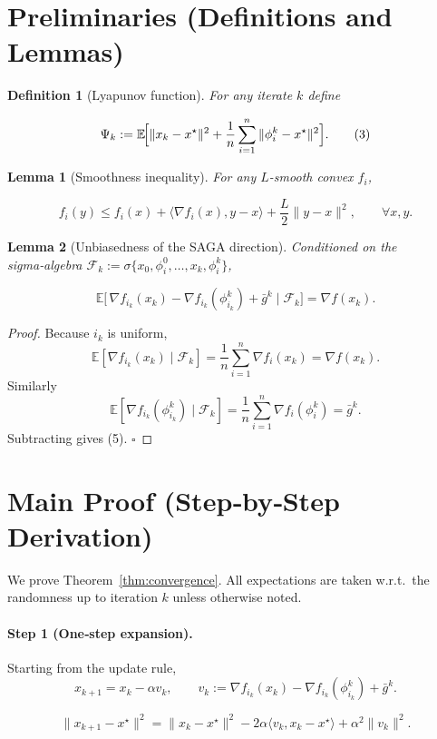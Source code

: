 \documentclass{article}
\newtheorem{lemma}{Lemma}
\newtheorem{definition}{Definition}
\newcommand{\E}{\mathbb{E}}
\begin{document}
\section*{Preliminaries (Definitions and Lemmas)}
\begin{definition}[Lyapunov function]
For any iterate \(k\) define  

\[
\Psi_k:=\E\!\Bigl[\|x_k-x^{\star}\|^{2}
      +\frac{1}{n}\sum_{i=1}^{n}\|\phi_i^{k}-x^{\star}\|^{2}\Bigr].
\tag{3}
\]
\end{definition}

\begin{lemma}[Smoothness inequality]\label{lem:smooth}
For any \(L\)-smooth convex \(f_i\),

\[
f_i(y)\le f_i(x)+\langle\nabla f_i(x),y-x\rangle+\frac{L}{2}\|y-x\|^{2},
\qquad\forall x,y.
\tag{4}
\]
\end{lemma}

\begin{lemma}[Unbiasedness of the SAGA direction]\label{lem:unbiased}
Conditioned on the sigma‑algebra \(\mathcal{F}_k:=\sigma\{x_0,\phi_i^{0},\dots ,x_k,\phi_i^{k}\}\),

\[
\E\!\bigl[\,\nabla f_{i_k}(x_k)-\nabla f_{i_k}(\phi_{i_k}^{k})+\bar g^{k}\mid\mathcal{F}_k\bigr]=\nabla f(x_k).
\tag{5}
\]
\end{lemma}
\begin{proof}
Because \(i_k\) is uniform,
\[
\E[\nabla f_{i_k}(x_k)\mid\mathcal{F}_k]=\frac{1}{n}\sum_{i=1}^{n}\nabla f_i(x_k)=\nabla f(x_k).
\]
Similarly
\[
\E[\nabla f_{i_k}(\phi_{i_k}^{k})\mid\mathcal{F}_k]=\frac{1}{n}\sum_{i=1}^{n}\nabla f_i(\phi_i^{k})=\bar g^{k}.
\]
Subtracting gives (5). \(\square\)
\end{proof}

\section*{Main Proof (Step‑by‑Step Derivation)}
We prove Theorem~\ref{thm:convergence}.  
All expectations are taken w.r.t.\ the randomness up to iteration \(k\) unless
otherwise noted.

\paragraph{Step 1 (One‑step expansion).}
Starting from the update rule,
\[
x_{k+1}=x_k-\alpha v_k,\qquad 
v_k:=\nabla f_{i_k}(x_k)-\nabla f_{i_k}(\phi_{i_k}^{k})+\bar g^{k}.
\tag{6}
\]

\[
\|x_{k+1}-x^{\star}\|^{2}
 =\|x_k-x^{\star}\|^{2}
    -2\alpha\langle v_k, x_k-x^{\star}\rangle
    +\alpha^{2}\|v_k\|^{2}.                               \tag{7}
\]
\end{document}
